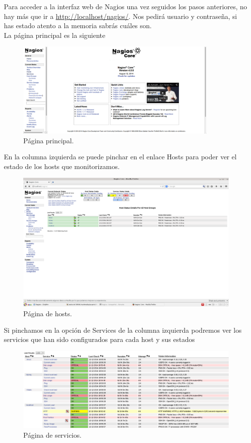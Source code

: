 \documentclass[11pt,a4paper]{article}
\begin{document}
Para acceder a la interfaz web de Nagios una vez seguidos los pasos anteriores, no hay más que ir a \url{http://localhost/nagios/}. Nos pedirá usuario y contraseña, si has estado atento a la memoria sabrás cuáles son.\\

La página principal es la siguiente

\begin{figure}[H]
  \centering
\includegraphics[width=10cm]{images/0.png} 
  \caption{Página principal.}
\end{figure}

En la columna izquierda se puede pinchar en el enlace Hosts para poder ver el estado de los hosts que monitorizamos.\\

\begin{figure}[H]
  \centering
\includegraphics[width=12cm]{images/2.png} 
  \caption{Página de hosts.}
\end{figure}

\newpage
Si pinchamos en la opción de Services de la columna izquierda podremos ver los servicios que han sido configurados para cada host y sus estados

\begin{figure}[H]
  \centering
\includegraphics[width=12cm]{images/8.png} 
  \caption{Página de servicios.}
\end{figure}
\end{document}
